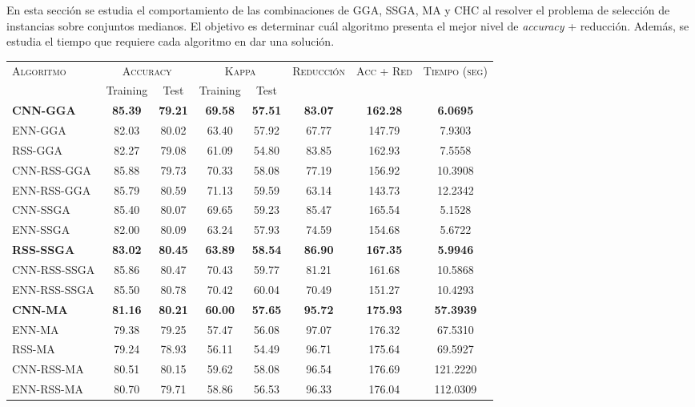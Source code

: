 En esta sección se estudia el comportamiento de las combinaciones de GGA, SSGA, MA y CHC al resolver el problema de selección de instancias sobre conjuntos medianos. El objetivo es determinar cuál algoritmo presenta el mejor nivel de \emph{accuracy} + reducción. Además, se estudia el tiempo que requiere cada algoritmo en dar una solución.

\begin{table}[h!]
\centering
\begin{adjustbox}{max width =\textwidth}
\begin{tabular}{l c c c c c c c}
\hline
\multirow{2}{*}{\textsc{Algoritmo}}
	& \multicolumn{2}{c}{\textsc{Accuracy}}
	& \multicolumn{2}{c}{\textsc{Kappa}}
	& \textsc{Reducción}
	& \textsc{Acc + Red}
	& \textsc{Tiempo (seg)} \\
	& Training & Test
	& Training & Test \\ 
\hline
\hline

\textbf{CNN-GGA}      & \textbf{85.39} & \textbf{79.21} & \textbf{69.58} & \textbf{57.51} & \textbf{83.07} & \textbf{162.28} & \textbf{6.0695} \\
ENN-GGA      & 82.03 & 80.02 & 63.40 & 57.92 & 67.77 & 147.79 & 7.9303 \\
RSS-GGA      & 82.27 & 79.08 & 61.09 & 54.80 & 83.85 & 162.93 & 7.5558 \\
CNN-RSS-GGA  & 85.88 & 79.73 & 70.33 & 58.08 & 77.19 & 156.92 & 10.3908 \\
ENN-RSS-GGA  & 85.79 & 80.59 & 71.13 & 59.59 & 63.14 & 143.73 & 12.2342 \\

\hline

CNN-SSGA & 85.40 & 80.07 & 69.65 & 59.23 & 85.47 & 165.54 & 5.1528 \\
ENN-SSGA & 82.00 & 80.09 & 63.24 & 57.93 & 74.59 & 154.68 & 5.6722 \\
\textbf{RSS-SSGA} & \textbf{83.02} & \textbf{80.45} & \textbf{63.89} & \textbf{58.54} & \textbf{86.90} & \textbf{167.35} & \textbf{5.9946} \\
CNN-RSS-SSGA & 85.86 & 80.47 & 70.43 & 59.77 & 81.21 & 161.68 & 10.5868 \\
ENN-RSS-SSGA & 85.50 & 80.78 & 70.42 & 60.04 & 70.49 & 151.27 & 10.4293 \\

\hline

\textbf{CNN-MA} & \textbf{81.16} & \textbf{80.21} & \textbf{60.00} & \textbf{57.65} & \textbf{95.72} & \textbf{175.93} & \textbf{57.3939} \\
ENN-MA & 79.38 & 79.25 & 57.47 & 56.08 & 97.07 & 176.32 & 67.5310 \\
RSS-MA & 79.24 & 78.93 & 56.11 & 54.49 & 96.71 & 175.64 & 69.5927 \\
CNN-RSS-MA & 80.51 & 80.15 & 59.62 & 58.08 & 96.54 & 176.69 & 121.2220 \\
ENN-RSS-MA & 80.70 & 79.71 & 58.86 & 56.53 & 96.33 & 176.04 & 112.0309 \\


\end{tabular}
\end{adjustbox}
\end{table}
